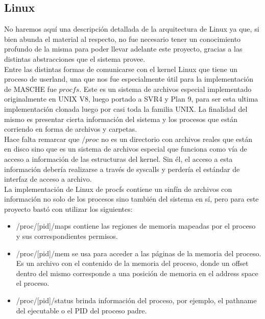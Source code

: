\subsection{Linux}

No haremos aquí una descripción detallada de la arquitectura de Linux ya que, si bien abunda el
material al respecto, no fue necesario tener un conocimiento profundo de la misma para
poder llevar adelante este proyecto, gracias a las distintas abstracciones que
el sistema provee.\\

Entre las distintas formas de comunicarse con el kernel Linux que tiene un
proceso de userland, una que nos fue especialmente útil para la implementación
de MASCHE fue $procfs$. Este es un sistema de archivos especial implementado
originalmente en UNIX V8, luego portado a SVR4 y Plan 9, para ser esta ultima
implementación clonada luego por casi toda la familia UNIX. La finalidad del
mismo es presentar cierta información del sistema y los procesos que están
corriendo en forma de archivos y carpetas.\\

Hace falta remarcar que $/proc$ no es un directorio con archivos reales que están
en disco sino que es un sistema de archivos especial que funciona como vía de
acceso a información de las estructuras del kernel. Sin él, el
acceso a esta información debería realizarse a través de syscalls y perdería el
estándar de interfaz de acceso a archivo.\\

La implementación de Linux de procfs contiene un sinfín de archivos con
información no solo de los procesos sino también del sistema en sí, pero para
este proyecto bastó con utilizar los siguientes:\\

\begin{itemize}

\item /proc/[pid]/maps contiene las regiones de memoria mapeadas por el proceso
    y sus correspondientes permisos.

\item /proc/[pid]/mem se usa para acceder a las páginas de la memoria del
    proceso. Es un archivo con el contenido de la memoria del proceso, donde un
    offset dentro del mismo corresponde a una posición de memoria en el address
    space el proceso.

\item /proc/[pid]/status brinda información del proceso, por ejemplo, el
    pathname del ejecutable o el PID del proceso padre.

\end{itemize}
